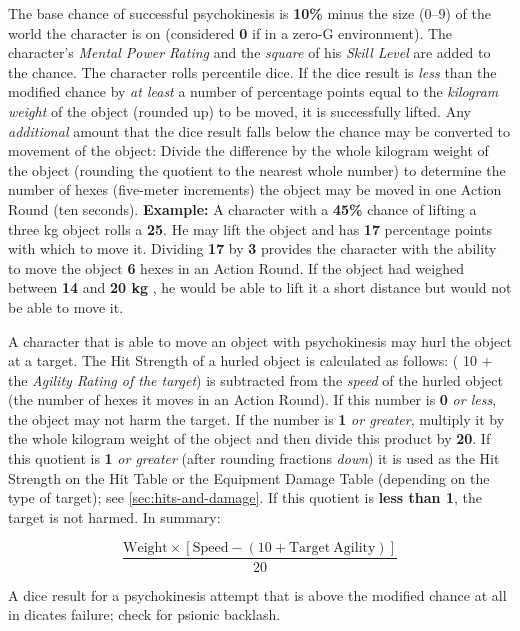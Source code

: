 The base chance of successful psychokinesis is \textbf{10\%} minus the
size (0--9) of the world the character is on (considered \textbf{0} if
in a zero-G environment).  The character's \emph{Mental Power Rating}
and the \emph{square} of his \emph{Skill Level} are added to the
chance.  The character rolls percentile dice.  If the dice result is
\emph{less} than the modified chance by \emph{at least} a number of
percentage points equal to the \emph{kilogram weight} of the object
(rounded up) to be moved, it is successfully lifted.  Any
\emph{additional} amount that the dice result falls below the chance
may be converted to movement of the object: Divide the difference by
the whole kilogram weight of the object (rounding the quotient to the
nearest whole number) to determine the number of hexes (five-meter
increments) the object may be moved in one Action Round (ten seconds).
\textbf{Example:} A character with a \textbf{45\%} chance of lifting a
three kg object rolls a \textbf{25}.  He may lift the object and has
\textbf{17} percentage points with which to move it.  Dividing
\textbf{17} by \textbf{3} provides the character with the ability to
move the object \textbf{6} hexes in an Action Round.  If the object had
weighed between \textbf{14} and \textbf{20 kg} , he would be able to
lift it a short distance but would not be able to move it.

A character that is able to move an object with psychokinesis may hurl
the object at a target.  The Hit Strength of a hurled object is
calculated as follows: ( 10 $+$ the \emph{Agility Rating of the
  target}) is subtracted from the \emph{speed} of the hurled object
(the number of hexes it moves in an Action Round).  If this number is
\textbf{0} \emph{or less}, the object may not harm the target.  If the
number is \textbf{1} \emph{or greater}, multiply it by the whole
kilogram weight of the object and then divide this product by
\textbf{20}.  If this quotient is \textbf{1} \emph{or greater} (after
rounding fractions \emph{down}) it is used as the Hit Strength on the
Hit Table or the Equipment Damage Table (depending on the type of
target); see \ref{sec:hits-and-damage}.  If this quotient is 
\textbf{less than 1}, the target is not harmed.  In summary: 

$$\frac{\mathrm{Weight}\times\left[\mathrm{Speed} - \left(10 +
      \mathrm{Target\ Agility}\right)\right]}{20}$$

    
A dice result for a psychokinesis attempt that is above the modified
chance at all in dicates failure; check for psionic backlash.

